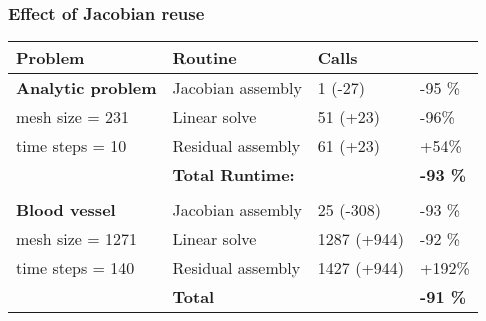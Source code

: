 \begin{frame}
  \frametitle{Effect of Jacobian reuse}

  \small
  \begin{tabular}{|l|l|l|l|}
    \hline
    \bf{Problem} & \bf{Routine} & \bf{Calls}  & \\
    \hline
    \bf{Analytic problem} &Jacobian assembly&     1 (-27)               & -95 \% \\
    mesh size = 231        &Linear solve&        51 ({\color{red}+23})  & -96\% \\
    time steps = 10        &Residual assembly&   61 ({\color{red}+23})  & {\color{red}+54\%} \\
                           &\bf{Total Runtime:} &                       & \bf{-93} \% \\

    &&&\\
    \hline
    \bf{Blood vessel}&Jacobian assembly&   25 (-308) & -93 \% \\
    mesh size = 1271    &Linear solve&        1287 ({\color{red}+944}) & -92 \% \\
    time steps = 140    &Residual assembly&   1427 ({\color{red}+944}) & {\color{red}+192}\%  \\
                        &\bf{Total}       &                            & \bf{-91 \%} \\
    \hline
  \end{tabular}
  \normalsize

\end{frame}

